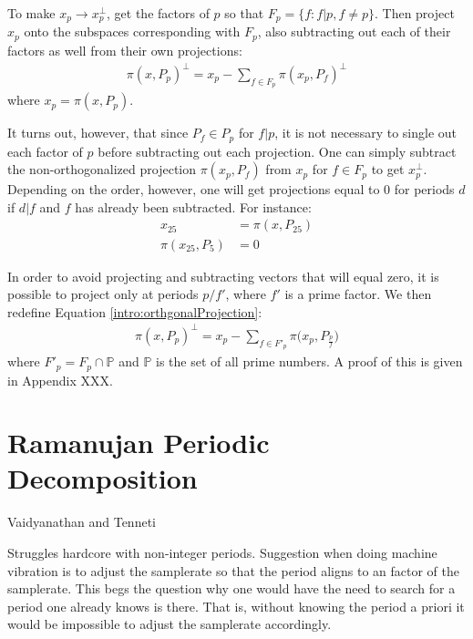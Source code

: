 To make $x_p \rightarrow x_p^\perp$, get the factors of $p$ so that $F_p = \{f : f|p, f \neq p\}$. Then project $x_p$ onto the subspaces corresponding with $F_p$, also subtracting out each of their factors as well from their own projections:
\begin{align}\label{intro:orthgonalProjection}
    \pi(x, P_p)^\perp = x_p - \sum_{f \in F_p} \pi(x_p, P_f)^\perp
\end{align}
where $x_p = \pi(x, P_p)$.

It turns out, however, that since $P_f \in P_p$ for $f|p$, it is not necessary to single out each factor of $p$ before subtracting out each projection. One can simply subtract the non-orthogonalized projection $\pi(x_p, P_f)$ from $x_p$ for $f \in F_p$ to get $x_p^\perp$. Depending on the order, however, one will get projections equal to 0 for periods $d$ if $d|f$ and $f$ has already been subtracted. For instance:
\begin{align*}
    x_{25} &= \pi(x, P_{25}) \\
    \pi(x_{25}, P_5) &= 0
\end{align*}

In order to avoid projecting and subtracting vectors that will equal zero, it is possible to project only at periods $p/f'$, where $f'$ is a prime factor. We then redefine Equation \eqref{intro:orthgonalProjection}:
\begin{align}
    \pi(x, P_p)^\perp = x_p - \sum_{f \in F'_p} \pi \bigg( x_p, P_{\frac{p}{f}} \bigg)
\end{align}
where $F'_p = F_p \cap \mathbb{P}$ and $\mathbb{P}$ is the set of all prime numbers. A proof of this is given in Appendix XXX.


\section{Ramanujan Periodic Decomposition}

Vaidyanathan and Tenneti

Struggles hardcore with non-integer periods. Suggestion when doing machine vibration is to adjust the samplerate so that the period aligns to an factor of the samplerate. This begs the question why one would have the need to search for a period one already knows is there. That is, without knowing the period a priori it would be impossible to adjust the samplerate accordingly.
